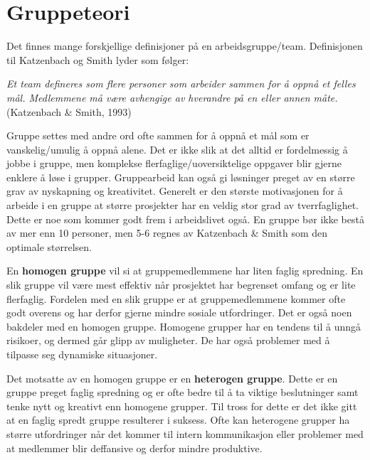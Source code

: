\section{Gruppeteori}
Det finnes mange forskjellige definisjoner på en arbeidsgruppe/team. 
Definisjonen til Katzenbach og Smith lyder som følger:

\begin{center}
\textit{Et team defineres som flere personer som arbeider sammen for å oppnå et felles mål. 
Medlemmene må være avhengige av hverandre på en eller annen måte.}
\newline 
(Katzenbach \& Smith, 1993)
\end{center}

Gruppe settes med andre ord ofte sammen for å oppnå et mål som er vanskelig/umulig å oppnå alene. 
Det er ikke slik at det alltid er fordelmessig å jobbe i gruppe, men komplekse flerfaglige/uoversiktelige oppgaver blir gjerne enklere å løse i grupper.
Gruppearbeid kan også gi løsninger preget av en større grav av nyskapning og kreativitet. 
Generelt er den største motivasjonen for å arbeide i en gruppe at større prosjekter har en veldig stor grad av tverrfaglighet. 
Dette er noe som kommer godt frem i arbeidslivet også. 
En gruppe bør ikke bestå av mer enn 10 personer, men 5-6 regnes av Katzenbach \& Smith som den optimale størrelsen.
\vspace{\secspace}

En \textbf{homogen gruppe} vil si at gruppemedlemmene har liten faglig spredning. 
En slik gruppe vil være mest effektiv når prosjektet har begrenset omfang og er lite flerfaglig. 
Fordelen med en slik gruppe er at gruppemedlemmene kommer ofte godt overens og har derfor gjerne mindre sosiale utfordringer. 
Det er også noen bakdeler med en homogen gruppe. 
Homogene grupper har en tendens til å unngå risikoer, og dermed går glipp av muligheter. 
De har også problemer med å tilpasse seg dynamiske situasjoner.
\vspace{\secspace}

Det motsatte av en homogen gruppe er en \textbf{heterogen gruppe}. 
Dette er en gruppe preget faglig spredning og er ofte bedre til å ta viktige beslutninger samt tenke nytt og kreativt enn homogene grupper. 
Til tross for dette er det ikke gitt at en faglig spredt gruppe resulterer i suksess. 
Ofte kan heterogene grupper ha større utfordringer når det kommer til intern kommunikasjon eller problemer med at medlemmer blir deffansive og derfor mindre produktive. 
